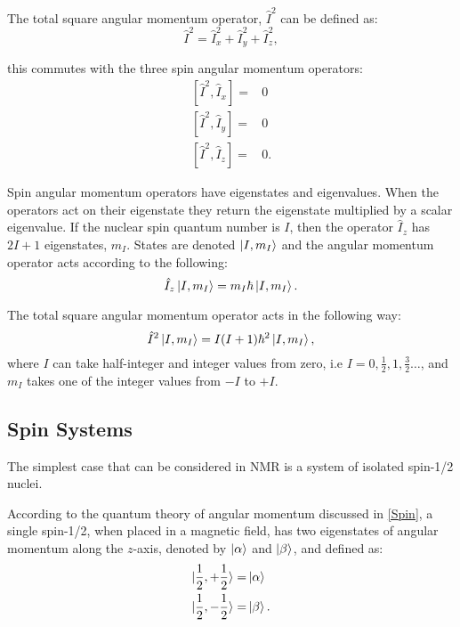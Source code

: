 The total square angular momentum operator, $\hat{I}^2$ can be defined as:
\begin{equation}
  \hat{I}^2 = \hat{I}_x^2 + \hat{I}_y^2 + \hat{I}_z^2,
\end{equation}

this commutes with the three spin angular momentum operators:
\begin{align}\label{eqn:I2commute}
  [\hat{I}^2,\hat{I}_x] =& 0\\
  [\hat{I}^2,\hat{I}_y] =& 0\\
  [\hat{I}^2,\hat{I}_z] =& 0.
\end{align}

Spin angular momentum operators have eigenstates and eigenvalues. When the operators act on their eigenstate
they return the eigenstate multiplied by a scalar eigenvalue. If the nuclear spin quantum number is $I$, then the operator $\hat{I}_z$ has $2I+1$
eigenstates, $m_I$. States are denoted $\ket{I,m_I}$ \citep{dirac_1939} and the angular momentum operator acts according to the following:
\begin{equation}
  \hat{I}_z\ket{I,m_I} = m_I\hbar\ket{I,m_I}.
\end{equation}

The total square angular momentum operator acts in the following way:
\begin{equation}
  \hat{I}^2\ket{I,m_I} = I(I+1)\hbar^2\ket{I,m_I},
\end{equation}
where $I$ can take half-integer and integer values from zero, i.e
$I = 0,\frac{1}{2},1,\frac{3}{2}\dots$, and $m_I$ takes one of the integer values from
$-I$ to $+I$.

\subsection{Spin Systems}\label{SpinStates}

The simplest case that can be considered in NMR is a system of isolated
spin-1/2 nuclei.

According to the quantum theory of angular momentum discussed in \ref{Spin}, a
single spin-1/2, when placed in a magnetic field, has two eigenstates of angular
momentum along the $z$-axis, denoted by $\ket{\alpha}$ and $\ket{\beta}$, and defined
as:
\begin{align}
  \ket{\frac{1}{2},+\frac{1}{2}} =& \ket{\alpha}\\
  \ket{\frac{1}{2},-\frac{1}{2}} =& \ket{\beta}.
 \end{align}


